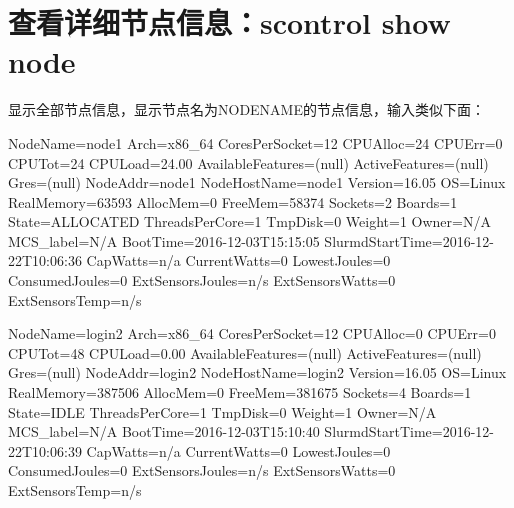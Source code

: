 \section{查看详细节点信息：scontrol show node}
显示全部节点信息，显示节点名为NODENAME的节点信息，输入类似下面：
\begin{OUT}
NodeName=node1 Arch=x86_64 CoresPerSocket=12
   CPUAlloc=24 CPUErr=0 CPUTot=24 CPULoad=24.00
   AvailableFeatures=(null)
   ActiveFeatures=(null)
   Gres=(null)
   NodeAddr=node1 NodeHostName=node1 Version=16.05
   OS=Linux RealMemory=63593 AllocMem=0 FreeMem=58374 Sockets=2 Boards=1
   State=ALLOCATED ThreadsPerCore=1 TmpDisk=0 Weight=1 Owner=N/A MCS_label=N/A
   BootTime=2016-12-03T15:15:05 SlurmdStartTime=2016-12-22T10:06:36
   CapWatts=n/a
   CurrentWatts=0 LowestJoules=0 ConsumedJoules=0
   ExtSensorsJoules=n/s ExtSensorsWatts=0 ExtSensorsTemp=n/s

NodeName=login2 Arch=x86_64 CoresPerSocket=12
   CPUAlloc=0 CPUErr=0 CPUTot=48 CPULoad=0.00
   AvailableFeatures=(null)
   ActiveFeatures=(null)
   Gres=(null)
   NodeAddr=login2 NodeHostName=login2 Version=16.05
   OS=Linux RealMemory=387506 AllocMem=0 FreeMem=381675 Sockets=4 Boards=1
   State=IDLE ThreadsPerCore=1 TmpDisk=0 Weight=1 Owner=N/A MCS_label=N/A
   BootTime=2016-12-03T15:10:40 SlurmdStartTime=2016-12-22T10:06:39
   CapWatts=n/a
   CurrentWatts=0 LowestJoules=0 ConsumedJoules=0
   ExtSensorsJoules=n/s ExtSensorsWatts=0 ExtSensorsTemp=n/s
\end{OUT}


